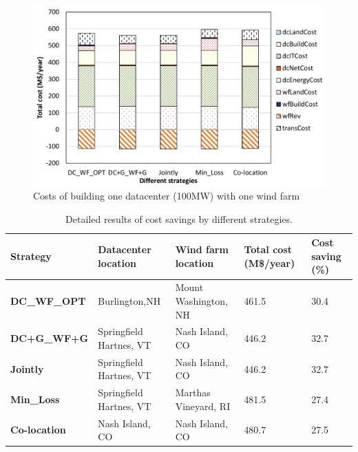\begin{figure}[ht]
\centering
\includegraphics[width=1\columnwidth]{img/cost-one-dc-one-wf}
\caption{Costs of building one datacenter (100MW) with one wind farm}
\label{fig:cost1dc1wf}
\end{figure}

\begin{table}[ht]
\begin{center}
\caption{Detailed results of cost savings by different strategies.}
\begin{tabular}{|l|p{50pt}|p{50pt}|p{30pt}|p{20pt}|}
\hline
\textbf{Strategy}& \textbf{Datacenter location} &\textbf{Wind farm location} &\textbf{Total cost (M\$/year)} &\textbf{Cost saving (\%)} \\
\hline
\textbf{DC\_WF\_OPT} &  Burlington,NH  & Mount Washington, NH & 461.5& 30.4 \\
\textbf{DC+G\_WF+G} &Springfield Hartnes, VT  & Nash Island, CO& 446.2& 32.7\\
\textbf{Jointly} &Springfield Hartnes, VT&  Nash Island, CO & 446.2 & 32.7\\
\textbf{Min\_Loss} &Springfield Hartnes, VT & Marthas Vineyard, RI & 481.5 & 27.4 \\
\textbf{Co-location}& Nash Island, CO &Nash Island, CO& 480.7 & 27.5  \\
\hline
\end{tabular}
\label{tab:costsaving}
\end{center}
\end{table}

